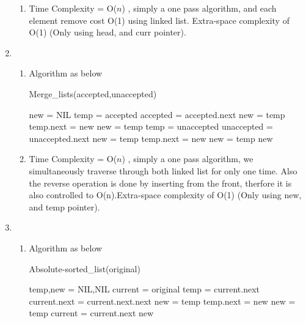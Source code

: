 \documentclass{article}
\begin{document}
\begin{CJK*}{UTF8}{bsmi}
\begin{enumerate}
\begin{enumerate}
        \item Time Complexity = O(${n}$) , simply a one pass algorithm, and each element remove cost O(1) using linked list. Extra-space complexity of O(1) (Only using head, and curr pointer).
    \end{enumerate} 
        
    
    \item \begin{enumerate}
        \item Algorithm as below 
        \begin{algorithm}[H]
        \caption{Merge\_lists(accepted,unaccepted)}
        \begin{algorithmic}
        \State new = NIL
            \State temp = accepted
            \State accepted = accepted.next
                \State new = temp
            \Else 
                \State temp.next = new
                \State new = temp
            \EndIf
        \Else
        \State temp = unaccepted
            \State unaccepted = unaccepted.next
                \State new = temp
            \Else 
                \State temp.next = new
                \State new = temp
            \EndIf
        \EndIf
        \EndWhile
        \State \Return new
        \end{algorithmic}
        \end{algorithm}

        \item Time Complexity = O(${n}$) , simply a one pass algorithm, we simultaneously traverse through both linked list for only one time. Also the reverse operation is done by inserting from the front, therfore it is also controlled to O(n).Extra-space complexity of O(1) (Only using new, and temp pointer).
    \end{enumerate}
        
    \item  \begin{enumerate}
        \item Algorithm as below
        \begin{algorithm}[H]
        \caption{Absolute-sorted\_list(original)}
        \begin{algorithmic}
        \State temp,new = NIL,NIL
        \State current = original
            \State temp = current.next
            \State current.next = current.next.next
                \State new = temp
            \Else 
                \State temp.next = new
                \State new = temp
            \EndIf
        \State current = current.next
        \EndIf
        \EndWhile
        \State \Return new
        \end{algorithmic}
        \end{algorithm}


\end{enumerate}
\end{enumerate}
\end{CJK*}
\end{document}
